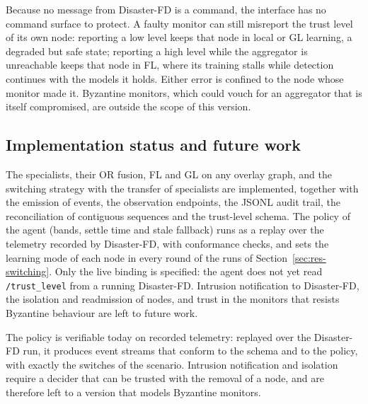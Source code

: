 Because no message from Disaster-FD is a command, the interface has no command surface to
protect. A faulty monitor can still misreport the trust level of its own node: reporting a
low level keeps that node in local or GL learning, a degraded but safe state; reporting a
high level while the aggregator is unreachable keeps that node in FL, where its training
stalls while detection continues with the models it holds. Either error is confined to the
node whose monitor made it. Byzantine monitors, which could vouch for an aggregator that is
itself compromised, are outside the scope of this version.

\subsection{Implementation status and future work}
\label{sec:api-status}

The specialists, their OR fusion, FL and GL on any overlay graph, and the switching
strategy with the transfer of specialists are implemented, together with the emission of
events, the observation endpoints, the JSONL audit trail, the reconciliation of contiguous
sequences and the trust-level schema. The policy of the agent (bands, settle time and stale
fallback) runs as a replay over the telemetry recorded by Disaster-FD, with conformance
checks, and sets the learning mode of each node in every round of the runs of
Section~\ref{sec:res-switching}. Only the live binding is specified: the agent does not yet
read \texttt{/trust\_level} from a running Disaster-FD. Intrusion notification to
Disaster-FD, the isolation and readmission of nodes, and trust in the monitors that resists
Byzantine behaviour are left to future work.

The policy is verifiable today on recorded telemetry: replayed over the Disaster-FD run, it
produces event streams that conform to the schema and to the policy, with exactly the
switches of the scenario. Intrusion notification and isolation require a decider that
can be trusted with the removal of a node, and are therefore left to a version that
models Byzantine monitors.

